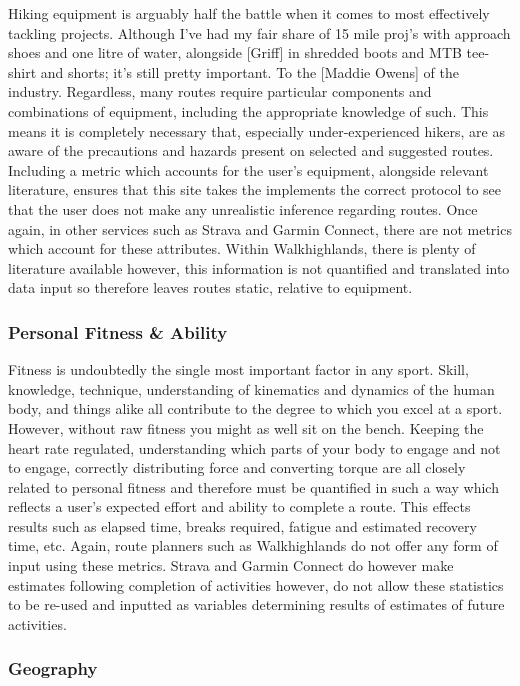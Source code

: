 \documentclass[11pt, english]{article}
\begin{document}
		Hiking equipment is arguably half the battle when it comes to most effectively tackling projects. Although I've had my fair share of 15 mile proj's with approach shoes and one litre of water, alongside [Griff] in shredded boots and MTB tee-shirt and shorts; it's still pretty important. To the [Maddie Owens] of the industry. Regardless, many routes require particular components and combinations of equipment, including the appropriate knowledge of such. This means it is completely necessary that, especially under-experienced hikers, are as aware of the precautions and hazards present on selected and suggested routes. Including a metric which accounts for the user's equipment, alongside relevant literature, ensures that this site takes the implements the correct protocol to see that the user does not make any unrealistic inference regarding routes. Once again, in other services such as Strava and Garmin Connect, there are not metrics which account for these attributes. Within Walkhighlands, there is plenty of literature available however, this information is not quantified and translated into data input so therefore leaves routes static, relative to equipment.

		\subsubsection{Personal Fitness \& Ability}

		Fitness is undoubtedly the single most important factor in any sport. Skill, knowledge, technique, understanding of kinematics and dynamics of the human body, and things alike all contribute to the degree to which you excel at a sport. However, without raw fitness you might as well sit on the bench. Keeping the heart rate regulated, understanding which parts of your body to engage and not to engage, correctly distributing force and converting torque are all closely related to personal fitness and therefore must be quantified in such a way which reflects a user's expected effort and ability to complete a route. This effects results such as elapsed time, breaks required, fatigue and estimated recovery time, etc. Again, route planners such as Walkhighlands do not offer any form of input using these metrics. Strava and Garmin Connect do however make estimates following completion of activities however, do not allow these statistics to be re-used and inputted as variables determining results of estimates of future activities.

		\subsubsection{Geography}
\end{document}
